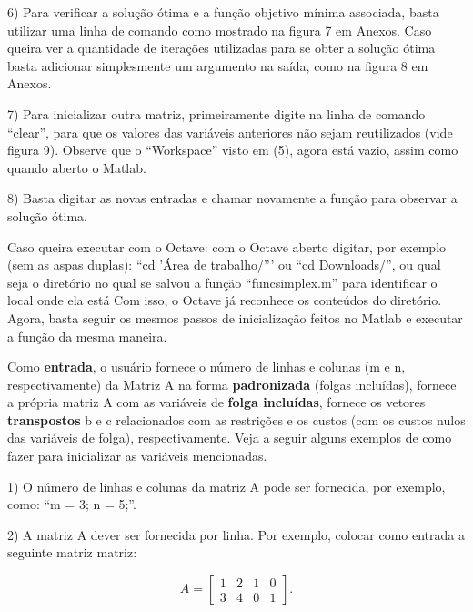 \documentclass[10pt]{article}
\begin{document}
6) Para verificar a solução ótima e a função objetivo mínima associada, basta utilizar uma linha de comando como mostrado na figura 7 em Anexos. Caso queira ver a quantidade de iterações utilizadas para se obter a solução ótima basta adicionar simplesmente um argumento na saída, como na figura 8 em Anexos.
\newline

7) Para inicializar outra matriz, primeiramente digite na linha de comando ``clear'', para que os valores das variáveis anteriores não sejam reutilizados (vide figura 9). Observe que o ``Workspace'' visto em (5), agora está vazio, assim como quando aberto o Matlab.
\newline

8) Basta digitar as novas entradas e chamar novamente a função para observar a solução ótima. 
\newline

Caso queira executar com o Octave: com o Octave aberto digitar, por exemplo (sem as aspas duplas): ``cd 'Área de trabalho/''' ou ``cd Downloads/'', ou qual seja o diretório no qual se salvou a função ``funcsimplex.m'' para identificar o local onde ela está  Com isso, o Octave já reconhece os conteúdos do diretório. Agora, basta seguir os mesmos passos de inicialização feitos no Matlab e executar a função da mesma maneira.
\newline

Como \textbf{entrada}, o usuário fornece o número de linhas e colunas (m e n, respectivamente) da Matriz A na forma \textbf{padronizada} (folgas incluídas), fornece a própria matriz A com as variáveis de \textbf{folga incluídas}, fornece os vetores \textbf{transpostos} b e c relacionados com as restrições e os custos (com os custos nulos das variáveis de folga), respectivamente. Veja a seguir alguns exemplos de como fazer para inicializar as variáveis mencionadas.
\newline

1) O número de linhas e colunas da matriz A pode ser fornecida, por exemplo, como: ``m = 3; n = 5;''.
\newline

2) A matriz A dever ser fornecida por linha. Por exemplo, colocar como entrada a seguinte matriz matriz:

\[
A =
  \begin{bmatrix}
    1 & 2 & 1 & 0\\
    3 & 4 & 0 & 1
  \end{bmatrix}.
\]
\newline
\end{document}

